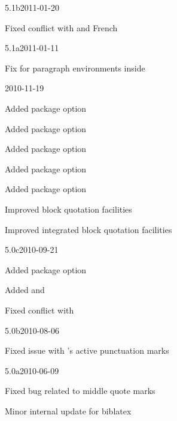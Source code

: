 \documentclass{ltxdockit}[2010/09/26]
\begin{document}
\begin{changelog}
\begin{release}{5.1b}{2011-01-20}
\item Fixed conflict with  and French
\end{release}

\begin{release}{5.1a}{2011-01-11}
\item Fix for paragraph environments inside 
\end{release}

\begin{release}{5.1}{2010-11-19}
\item Added package option 
\item Added package option 
\item Added package option 
\item Added package option 
\item Added package option 
\item Improved block quotation facilities
\item Improved integrated block quotation facilities
\end{release}

\begin{release}{5.0c}{2010-09-21}
\item Added package option 
\item Added  and 
\item Fixed conflict with 
\end{release}

\begin{release}{5.0b}{2010-08-06}
\item Fixed issue with 's active punctuation marks
\end{release}

\begin{release}{5.0a}{2010-06-09}
\item Fixed bug related to middle quote marks
\item Minor internal update for biblatex
\end{release}


\end{changelog}
\end{document}
